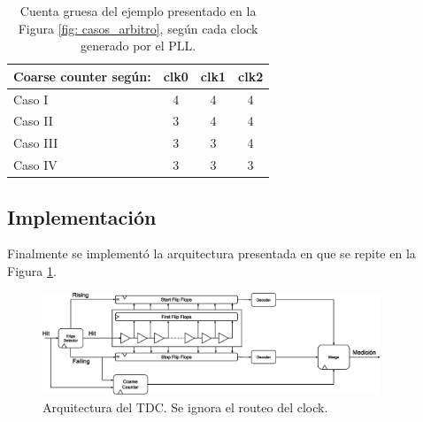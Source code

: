 \begin{table}[H]
     \centering
     \begin{tabular}{|l|c|c|c|}
     \hline
     Coarse counter según: & clk0 & clk1 & clk2 \\ \hline
     Caso I                & 4    & 4    & 4    \\ \hline
     Caso II               & 3    & 4    & 4    \\ \hline
     Caso III              & 3    & 3    & 4    \\ \hline
     Caso IV               & 3    & 3    & 3    \\ \hline
     \end{tabular}
     \caption{Cuenta gruesa del ejemplo presentado en la Figura \ref{fig: casos_arbitro}, según cada clock generado por el PLL.}
     \label{tabla: arbitro}
\end{table}


\subsection{Implementación}
Finalmente se implementó la arquitectura presentada en \cite{machado_novel_2018} que se repite en la Figura \ref{fig: TDC}.
\begin{figure}[H]
     \centering
     \includegraphics[width=0.9\textwidth]{imagenes/arq_tdc.eps}
     \caption{Arquitectura del TDC. Se ignora el routeo del clock.}
     \label{fig: TDC}
\end{figure}

